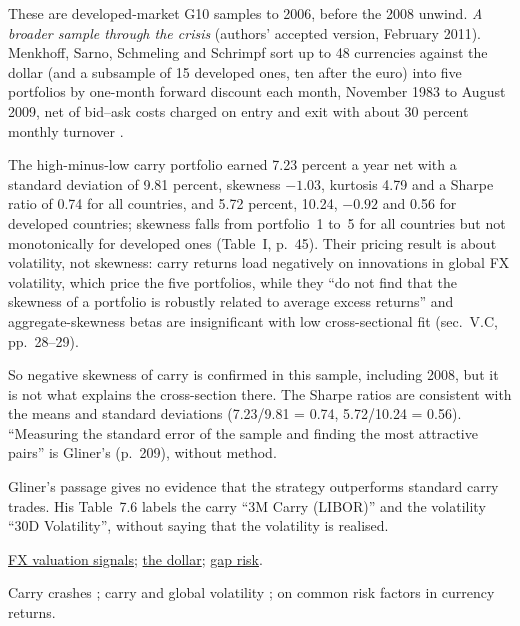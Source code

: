 \begin{qfmodel}
These are developed-market G10 samples to 2006, before the 2008 unwind. \emph{A broader sample through the crisis} (authors' accepted version, February 2011). Menkhoff, Sarno, Schmeling and Schrimpf sort up to 48 currencies against the dollar (and a subsample of 15 developed ones, ten after the euro) into five portfolios by one-month forward discount each month, November 1983 to August 2009, net of bid--ask costs charged on entry and exit with about 30 percent monthly turnover \citep[sec.~II, pp.~8--9]{msss-2012}.

The high-minus-low carry portfolio earned 7.23 percent a year net with a standard deviation of 9.81 percent, skewness $-1.03$, kurtosis 4.79 and a Sharpe ratio of 0.74 for all countries, and 5.72 percent, 10.24, $-0.92$ and 0.56 for developed countries; skewness falls from portfolio~1 to~5 for all countries but not monotonically for developed ones (Table~I, p.~45). Their pricing result is about volatility, not skewness: carry returns load negatively on innovations in global FX volatility, which price the five portfolios, while they ``do not find that the skewness of a portfolio is robustly related to average excess returns'' and aggregate-skewness betas are insignificant with low cross-sectional fit (sec.~V.C, pp.~28--29).

So negative skewness of carry is confirmed in this sample, including 2008, but it is not what explains the cross-section there. The Sharpe ratios are consistent with the means and standard deviations (7.23/9.81 = 0.74, 5.72/10.24 = 0.56). ``Measuring the standard error of the sample and finding the most attractive pairs'' is Gliner's (p.~209), without method.

 Gliner's passage gives no evidence that the strategy outperforms standard carry trades. His Table~7.6 labels the carry ``3M Carry (LIBOR)'' and the volatility ``30D Volatility'', without saying that the volatility is realised.

 \hyperref[meth:fx-valuation-signals]{FX valuation signals}; \hyperref[def:us-dollar-dxy-sdr]{the dollar}; \hyperref[meth:macro-position-sizing-risk]{gap risk}.

 Carry crashes \citep{catalogue-0241}; carry and global volatility \citep{wide-menkhoff-carry}; \citep{catalogue-0240} on common risk factors in currency returns.

\end{qfmodel}
